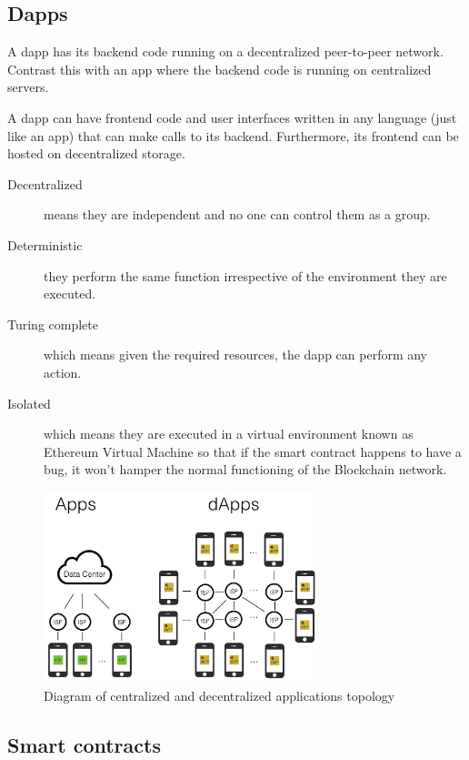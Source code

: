\subsection{Dapps}

A dapp has its backend code running on a decentralized peer-to-peer network. Contrast this with an app where the backend code is running on centralized servers.

A dapp can have frontend code and user interfaces written in any language (just like an app) that can make calls to its backend. Furthermore, its frontend can be hosted on decentralized storage.\cite{ethereumcommunityEthereumDevelopmentDocumentation}

\begin{description}
\item[Decentralized] means they are independent and no one can control them as a group.
\item[Deterministic] they perform the same function irrespective of the environment they are executed.
\item[Turing complete] which means given the required resources, the dapp can perform any action.
\item[Isolated] which means they are executed in a virtual environment known as Ethereum Virtual Machine so that if the smart contract happens to have a bug, it won’t hamper the normal functioning of the Blockchain network.
\end{description}

\begin{figure}[H]
	\centering
		\includegraphics[width=8cm]{images/chapter2/dapps.png}
		\caption{{\footnotesize Diagram of centralized and decentralized applications topology}}
\end{figure}

\subsection{Smart contracts}

